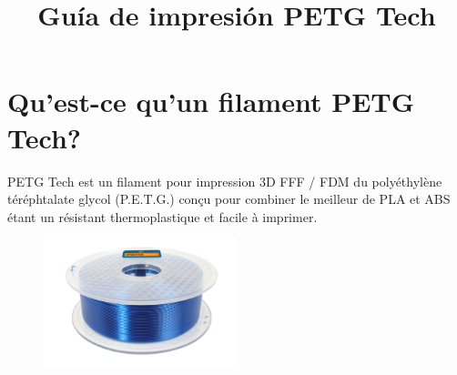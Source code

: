 \documentclass[11pt,a4paper]{article}
\title{Guía de impresión PETG Tech}
\date{}
\begin{document}
  
  \section{Qu’est-ce qu’un filament PETG Tech?}PETG Tech est un filament pour impression 3D FFF / FDM du polyéthylène téréphtalate glycol (P.E.T.G.) conçu pour combiner le meilleur de PLA et ABS étant un résistant thermoplastique et facile à imprimer.
  \begin{figure}[H]
  \centering
  \includegraphics[width=0.5\textwidth,cfbox=azul_marcos 1pt 0pt]{FOTOS/PETGKILOAZUL}
  \end{figure}
\end{document}

